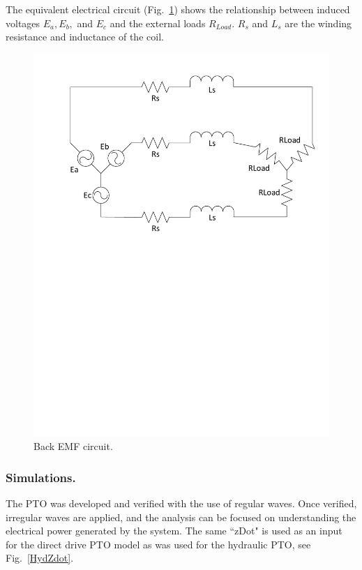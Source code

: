 \documentclass[twocolumn,10pt]{asme2e}
\begin{document}
The equivalent electrical circuit (Fig.~\ref{EMF}) shows the relationship between induced voltages $E_a, E_b,$ and $E_c$ and the external loads $R_{Load}$. $R_s$ and $L_s$ are the winding resistance and inductance of the coil. 

\begin{figure}[t]
    \centering
    \includegraphics[width=1\columnwidth]{Images/BackEMFCkt}
    \caption{Back EMF circuit.}
    \label{EMF}
    \end{figure}

\subsubsection*{Simulations.}
 
The PTO was developed and verified with the use of regular waves. Once verified, irregular waves are applied, and the analysis can be focused on understanding the electrical power generated by the system. The same ``zDot" is used as an input for the direct drive PTO model as was used for the hydraulic PTO, see Fig.~\ref{HydZdot}. 
\end{document}
